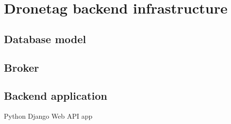 \chapter{Dronetag backend infrastructure}

\section{Database model}

\section {Broker}

\section{Backend application}
Python Django Web API app